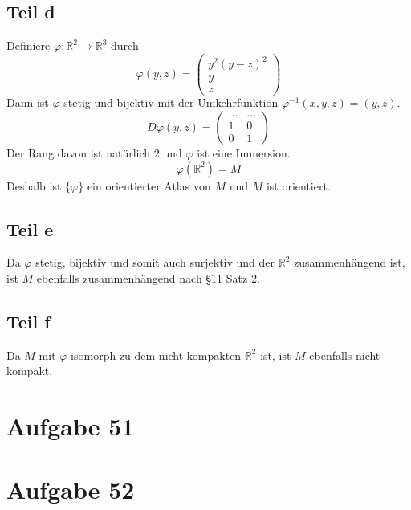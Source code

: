 \documentclass[10pt,a4paper]{article}
\begin{document}
\subsection{Teil d}

Definiere $\varphi : \mathbb{R}^{2} \rightarrow \mathbb{R}^{3}$ durch
\begin{equation}
  \varphi(y, z) = \begin{pmatrix}
    y^{2}(y - z)^{2}\\
    y\\
    z
  \end{pmatrix}
\end{equation}
Dann ist $\varphi$ stetig und bijektiv mit der Umkehrfunktion $\varphi^{-1}(x, y, z) = (y, z)$.
\begin{equation}
  D\varphi(y, z) = \begin{pmatrix}
    \dots & \dots\\
    1 & 0\\
    0 & 1
  \end{pmatrix}
\end{equation}
Der Rang davon ist natürlich $2$ und $\varphi$ ist eine Immersion.
\begin{equation}
  \varphi(\mathbb{R}^{2}) = M
\end{equation}
Deshalb ist $\{ \varphi \}$ ein orientierter Atlas von $M$ und $M$ ist orientiert.

\subsection{Teil e}

Da $\varphi$ stetig, bijektiv und somit auch surjektiv und der $\mathbb{R}^{2}$ zusammenhängend ist, ist $M$ ebenfalls zusammenhängend nach §11 Satz 2.

\subsection{Teil f}

Da $M$ mit $\varphi$ isomorph zu dem nicht kompakten $\mathbb{R}^{2}$ ist, ist $M$ ebenfalls nicht kompakt.

\section{Aufgabe 51}

\section{Aufgabe 52}
\end{document}
